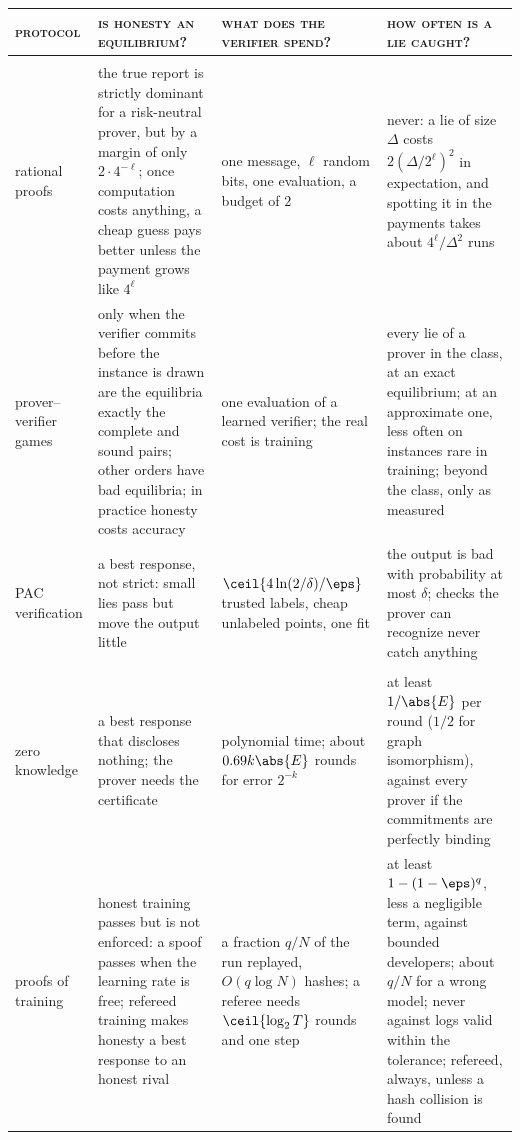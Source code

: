\begin{refsection}
\begin{table}[p]
\begin{fullwidth}
\footnotesize
\renewcommand{\arraystretch}{1.18}
\begin{tabularx}{\linewidth}{@{}>{\raggedright\arraybackslash}p{24mm}>{\raggedright\arraybackslash}X>{\raggedright\arraybackslash}X>{\raggedright\arraybackslash}X@{}}
\toprule
\textsc{\color{prover}protocol} & \textsc{\color{verifier}is honesty an equilibrium?} & \textsc{\color{verifier}what does the verifier spend?} & \textsc{\color{verifier}how often is a lie caught?}\\
\midrule
\multicolumn{4}{@{}l}{\textsc{\color{prover}part iv. incentives}}\\[0.3ex]
10\enspace rational proofs & the true report is strictly dominant for a risk-neutral prover, but by a margin of only $2\cdot4^{-\ell}$; once computation costs anything, a cheap guess pays better unless the payment grows like $4^\ell$ & one message, $\ell$ random bits, one evaluation, a budget of $2$ & never: a lie of size $\Delta$ costs $2(\Delta/2^\ell)^2$ in expectation, and spotting it in the payments takes about $4^\ell/\Delta^2$ runs \\
11\enspace prover--verifier games & only when the verifier commits before the instance is drawn are the equilibria exactly the complete and sound pairs; other orders have bad equilibria; in practice honesty costs accuracy & one evaluation of a learned verifier; the real cost is training & every lie of a prover in the class, at an exact equilibrium; at an approximate one, less often on instances rare in training; beyond the class, only as measured \\
12\enspace PAC verification & a best response, not strict: small lies pass but move the output little & $\ceil{4\ln(2/\delta)/\eps}$ trusted labels, cheap unlabeled points, one fit & the output is bad with probability at most $\delta$; checks the prover can recognize never catch anything \\[0.4ex]
\multicolumn{4}{@{}l}{\textsc{\color{prover}part v. secrets and limits}}\\[0.3ex]
13\enspace zero knowledge & a best response that discloses nothing; the prover needs the certificate & polynomial time; about $0.69k\abs{E}$ rounds for error $2^{-k}$ & at least $1/\abs{E}$ per round ($1/2$ for graph isomorphism), against every prover if the commitments are perfectly binding \\
14\enspace proofs of training & honest training passes but is not enforced: a spoof passes when the learning rate is free; refereed training makes honesty a best response to an honest rival & a fraction $q/N$ of the run replayed, $O(q\log N)$ hashes; a referee needs $\ceil{\log_2T}$ rounds and one step & at least $1-(1-\eps)^q$, less a negligible term, against bounded developers; about $q/N$ for a wrong model; never against logs valid within the tolerance; refereed, always, unless a hash collision is found \\

\end{tabularx}
\end{fullwidth}
\end{table}
\end{refsection}
